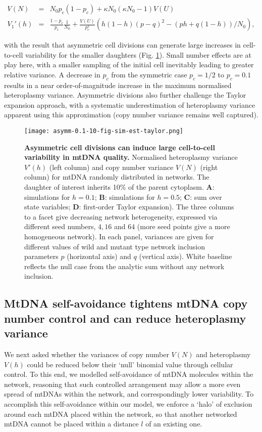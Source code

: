 \documentclass{article}
\begin{document}
\begin{eqnarray}
    V(N) & = &N_0 p_c(1-p_c) +\kappa N_0(\kappa N_0-1)V(U) \\
    V_1'(h)& = &\frac{1-p_c}{p_c} \frac{1}{N_0} + \frac{V(U)}{p_c^2} \left( h(1-h) (p-q)^2 - (p h + q(1-h))/N_0 \right),
\end{eqnarray}

with the result that asymmetric cell divisions can generate large increases in cell-to-cell variability for the smaller daughters (Fig. \ref{fig:sim-model-compare-10}). Small number effects are at play here, with a smaller sampling of the initial cell inevitably leading to greater relative variance.  A decrease in $p_c$ from the symmetric case $p_c = 1/2$ to $p_c = 0.1$ results in a near order-of-magnitude increase in the maximum normalised heteroplasmy variance. Asymmetric divisions also further challenge the Taylor expansion approach, with a systematic underestimation of heteroplasmy variance apparent using this approximation (copy number variance remains well captured).

\begin{figure}
\centering
\texttt{[image: asymm-0.1-10-fig-sim-est-taylor.png]}
\caption{\textbf{Asymmetric cell divisions can induce large cell-to-cell variability in mtDNA quality.} Normalised heteroplasmy variance $V'(h)$ (left column) and copy number variance $V(N)$ (right column) for mtDNA randomly distributed in networks.  The daughter of interest inherits 10\% of the parent cytoplasm.  \textbf{A}: simulations for $h=0.1$; \textbf{B}: simulations for $h=0.5$; \textbf{C}: sum over state variables; \textbf{D}: first-order Taylor expansion). The three columns to a facet give decreasing network heterogeneity, expressed via different seed numbers, $4, 16$ and $64$ (more seed points give a more homogeneous network). In each panel, variances are given for different values of wild and mutant type network inclusion parameters $p$ (horizontal axis) and $q$ (vertical axis). White baseline reflects the null case from the analytic sum without any network inclusion.}\label{fig:sim-model-compare-10}
\end{figure}


\subsection{MtDNA self-avoidance tightens mtDNA copy number control and can reduce heteroplasmy variance}
We next asked whether the variances of copy number $V(N)$ and heteroplasmy $V(h)$ could be reduced below their `null' binomial value through cellular control. To this end, we modelled self-avoidance of mtDNA molecules within the network, reasoning that such controlled arrangement may allow a more even spread of mtDNAs within the network, and correspondingly lower variability. To accomplish this self-avoidance within our model, we enforce a `halo' of exclusion around each mtDNA placed within the network, so that another networked mtDNA cannot be placed within a distance $l$ of an existing one.%
\end{document}
